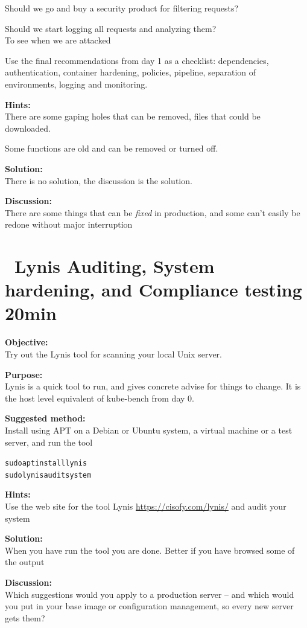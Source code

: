 \documentclass[a4paper,11pt,notitlepage]{report}
\begin{document}
Should we go and buy a security product for filtering requests?

Should we start logging all requests and analyzing them?\\
To see when we are attacked

Use the final recommendations from day 1 as a checklist: dependencies, authentication, container hardening, policies, pipeline, separation of environments, logging and monitoring.

{\bf Hints:}\\
There are some gaping holes that can be removed, files that could be downloaded.

Some functions are old and can be removed or turned off.

{\bf Solution:}\\
There is no solution, the discussion is the solution.

{\bf Discussion:}\\
There are some things that can be \emph{fixed} in production, and some can't easily be redone without major interruption


\chapter{\faInfoCircle\ Lynis Auditing, System hardening, and Compliance testing 20min}
\label{ex:lynis-first}


{\bf Objective:}\\
Try out the Lynis tool for scanning your local Unix server.

{\bf Purpose:}\\
Lynis is a quick tool to run, and gives concrete advise for things to change. It is the host level equivalent of kube-bench from day 0.

{\bf Suggested method:}\\
Install using APT on a Debian or Ubuntu system, a virtual machine or a test server, and run the tool

\begin{alltt}
sudo apt install lynis
sudo lynis audit system
\end{alltt}

{\bf Hints:}\\
Use the web site for the tool Lynis \url{https://cisofy.com/lynis/} and audit your system

{\bf Solution:}\\
When you have run the tool you are done. Better if you have browsed some of the output

{\bf Discussion:}\\
Which suggestions would you apply to a production server -- and which would you put in your base image or configuration management, so every new server gets them?
\end{document}
